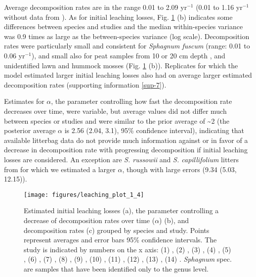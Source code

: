 \documentclass[bg, manuscript]{copernicus}
\begin{document}
Average decomposition rates are in the range 0.01 to 2.09 yr\(^{-1}\) (0.01 to 1.16 yr\(^{-1}\) without data from \citet{Bengtsson.2017}). As for initial leaching losses, Fig. \ref{fig:out-mm36-1-p5} (b) indicates some differences between species and studies and the median within-species variance was 0.9 times as large as the between-species variance (log scale). Decomposition rates were particularly small and consistent for \emph{Sphagnum fuscum} (range: 0.01 to 0.06 yr\(^{-1}\)), and small also for peat samples from 10 or 20 cm depth \citep{Prevost.1997}, and unidentified lawn and hummock mosses \citep{Bartsch.1985} (Fig. \ref{fig:out-mm36-1-p5} (b)). Replicates for which the model estimated larger initial leaching losses also had on average larger estimated decomposition rates (supporting information \ref{sup-7}).

Estimates for \(\alpha\), the parameter controlling how fast the decomposition rate decreases over time, were variable, but average values did not differ much between species or studies and were similar to the prior average of \textasciitilde2 (the posterior average \(\alpha\) is 2.56 (2.04, 3.1), 95\% confidence interval), indicating that available litterbag data do not provide much information against or in favor of a decrease in decomposition rate with progressing decomposition if initial leaching losses are considered. An exception are \emph{S. russowii} and \emph{S. capillifolium} litters from \citet{Hagemann.2015} for which we estimated a larger \(\alpha\), though with large errors (9.34 (5.03, 12.15)).



\begin{figure}[H]

{\centering \texttt{[image: figures/leaching\_plot\_1\_4]} 

}

\caption{Estimated initial leaching losses (a), the parameter controlling a decrease of decomposition rates over time (\(\alpha\)) (b), and decomposition rates (c) grouped by species and study. Points represent averages and error bars 95\% confidence intervals. The study is indicated by numbers on the x axis: (1) \citet{Asada.2005b}, (2) \citet{Bartsch.1985}, (3) \citet{Breeuwer.2008}, (4) \citet{Golovatskaya.2017}, (5) \citet{Hagemann.2015}, (6) \citet{Johnson.1991}, (7) \citet{Makila.2018}, (8) \citet{Prevost.1997}, (9) \citet{Scheffer.2001}, (10) \citet{Strakova.2010}, (11) \citet{Szumigalski.1996}, (12) \citet{Thormann.2001}, (13) \citet{Trinder.2008}, (14) \citet{Vitt.1990}. \emph{Sphagnum} spec. are samples that have been identified only to the genus level.}\label{fig:out-mm36-1-p5}
\end{figure}
\end{document}
